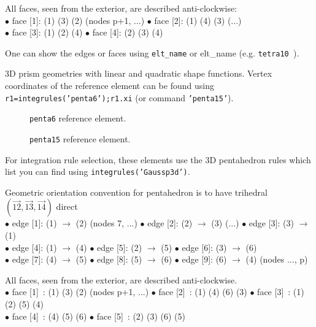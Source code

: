    All faces, seen from the exterior, are described anti-clockwise:   \\
   $\bullet$ face [1]: (1) (3) (2) (nodes p+1, ...) 
   $\bullet$ face [2]: (1) (4) (3) (...)  \\
   $\bullet$ face [3]: (1) (2) (4) 
   $\bullet$ face [4]: (2) (3) (4)

One can show the edges or faces using {\tt {\ti elt\_name}}  or {\ti elt\_name}  (e.g. {\tt tetra10 }).


3D prism geometries with linear and quadratic shape functions. Vertex coordinates of the reference element can be found using  {\tt r1=integrules('penta6');r1.xi} (or command {\tt 'penta15'}).

\begin{figure}[H]
\centering
{} %
 \caption{{\tt penta6} reference element.}
\end{figure}


\begin{figure}[H]
\centering
{} %
 \caption{{\tt penta15} reference element.}
\end{figure}

For integration rule selection, these elements use the 3D pentahedron rules which list you can find using {\tt integrules('Gaussp3d')}.

Geometric orientation convention for pentahedron is to have trihedral $(\vec{12},\vec{13},\vec{14})$ direct \\
   $\bullet$ edge [1]: (1) $\rightarrow$ (2)  (nodes 7, ...) 
   $\bullet$ edge [2]: (2) $\rightarrow$ (3)  (...) 
   $\bullet$ edge [3]: (3) $\rightarrow$ (1)  \\
   $\bullet$ edge [4]: (1) $\rightarrow$ (4) 
   $\bullet$ edge [5]: (2) $\rightarrow$ (5) 
   $\bullet$ edge [6]: (3) $\rightarrow$ (6) \\
   $\bullet$ edge [7]: (4) $\rightarrow$ (5) 
   $\bullet$ edge [8]: (5) $\rightarrow$ (6) 
   $\bullet$ edge [9]: (6) $\rightarrow$ (4) (nodes ..., p)

   All faces, seen from the exterior, are described anti-clockwise. \\
   $\bullet$ face [1]~: (1) (3) (2)        (nodes p+1, ...) 
   $\bullet$ face [2]~: (1) (4) (6) (3)     
   $\bullet$ face [3]~: (1) (2) (5) (4) \\
   $\bullet$ face [4]~: (4) (5) (6) 
   $\bullet$ face [5]~: (2) (3) (6) (5)

